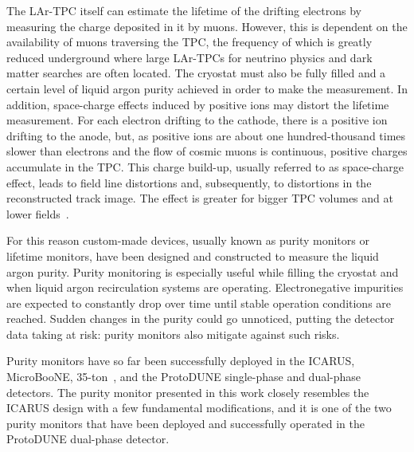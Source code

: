 \documentclass[a4paper,11pt]{article}
\begin{document}
The LAr-TPC itself can estimate the lifetime of the drifting electrons by measuring the charge deposited in it by muons. However, this is dependent on the availability of muons traversing the TPC, the frequency of which is greatly reduced underground where large LAr-TPCs for neutrino physics and dark matter searches are often located. The cryostat must also be fully filled and a certain level of liquid argon purity achieved in order to make the measurement. In addition, space-charge effects induced by positive ions may distort the lifetime measurement. For each electron drifting to the cathode, there is a positive ion drifting to the anode, but, as positive ions are about one hundred-thousand times slower than electrons and the flow of cosmic muons is continuous, positive charges accumulate in the TPC. This charge build-up, usually referred to as space-charge effect, leads to field line distortions and, subsequently, to distortions in the reconstructed track image. The effect is greater for bigger TPC volumes and at lower fields~\cite{Romero2017}.

For this reason custom-made devices, usually known as purity monitors or lifetime monitors, have been designed and constructed to measure the liquid argon purity. 
Purity monitoring is especially useful while filling the cryostat and when liquid argon recirculation systems are operating. Electronegative impurities are expected to constantly drop over time until stable operation conditions are reached. 
Sudden changes in the purity could go unnoticed, putting the detector data taking at risk: purity monitors also mitigate against such risks. 

Purity monitors have so far been successfully deployed in the ICARUS, MicroBooNE, 35-ton~\cite{IDRvol2,Wallbank:2017hfw}, and the ProtoDUNE single-phase and dual-phase detectors.
The purity monitor presented in this work closely resembles the ICARUS design with a few fundamental modifications, and it is one of the two purity monitors that have been deployed and successfully operated in the ProtoDUNE dual-phase detector. %

\end{document}
